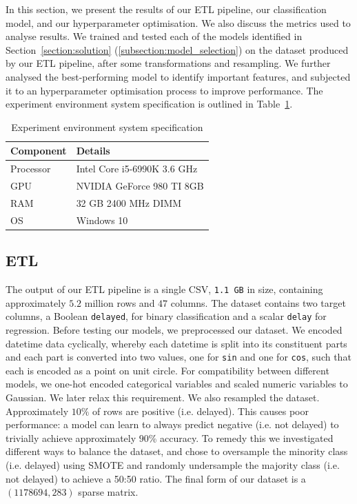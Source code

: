 \documentclass[12pt,a4paper]{article}
\begin{document}
In this section, we present the results of our ETL pipeline, our classification model, and our hyperparameter optimisation. We also discuss the metrics used to analyse results. We trained and tested each of the models identified in Section~\ref{section:solution} (\ref{subsection:model_selection}) on the dataset produced by our ETL pipeline, after some transformations and resampling. We further analysed the best-performing model to identify important features, and subjected it to an hyperparameter optimisation process to improve performance. The experiment environment system specification is outlined in Table~\ref{table:experiment}.

\begin{table}[htb]
\centering
\caption{Experiment environment system specification}
\label{table:experiment}
\begin{tabular}{|l|l|}
\hline
{\bf Component} & {\bf Details}                     \\ \hline
Processor & Intel Core i5-6990K 3.6 GHz \\ \hline
GPU       & NVIDIA GeForce 980 TI 8GB   \\ \hline
RAM       & 32 GB 2400 MHz DIMM         \\ \hline
OS        & Windows 10                  \\ \hline
\end{tabular}
\end{table}

\subsection{ETL}

The output of our ETL pipeline is a single CSV, \verb|1.1 GB| in size, containing approximately $5.2$ million rows and $47$ columns. The dataset contains two target columns, a Boolean \verb|delayed|, for binary classification and a scalar \verb|delay| for regression. Before testing our models, we preprocessed our dataset. We encoded datetime data cyclically, whereby each datetime is split into its constituent parts and each part is converted into two values, one for \verb|sin| and one for \verb|cos|, such that each is encoded as a point on unit circle. For compatibility between different models, we one-hot encoded categorical variables and scaled numeric variables to Gaussian. We later relax this requirement. We also resampled the dataset. Approximately $10\%$ of rows are positive (i.e. delayed). This causes poor performance: a model can learn to always predict negative (i.e. not delayed) to trivially achieve approximately $90$\% accuracy. To remedy this we investigated different ways to balance the dataset, and chose to oversample the minority class (i.e. delayed) using SMOTE \cite{chawla_et_al_2002} and randomly undersample the majority class (i.e. not delayed) to achieve a 50:50 ratio. The final form of our dataset is a $(1178694, 283)$ sparse matrix.
\end{document}
